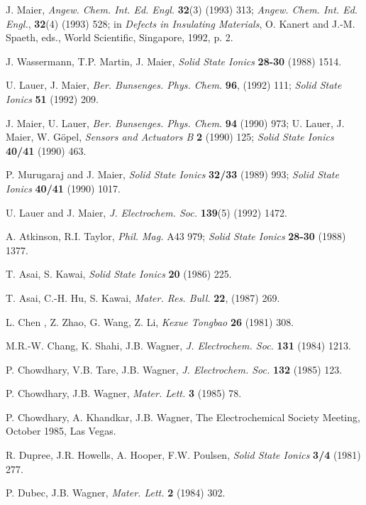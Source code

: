 \documentclass{elsart}
\begin{document}
\begin{thebibliography}{999}
 J. Maier, {\em Angew. Chem. Int. Ed. Engl.\/} {\bf 32}(3)
  (1993) 313; {\em Angew. Chem. Int. Ed. Engl.\/}, {\bf 32}(4) (1993) 528; in 
{\em Defects in Insulating Materials\/}, O. Kanert and J.-M. Spaeth, eds.,
World Scientific, Singapore, 1992, p. 2. 

 J. Wassermann, T.P. Martin, J. Maier, {\em Solid State Ionics\/}
{\bf 28-30} (1988) 1514.

 U. Lauer, J. Maier, {\em Ber. Bunsenges. Phys. Chem.\/} {\bf 96},
(1992) 111; {\em Solid State Ionics\/} {\bf 51} (1992) 209.

 J. Maier, U. Lauer, {\em Ber. Bunsenges. Phys. Chem.\/} {\bf
  94} (1990) 973; U. Lauer, J. Maier, W. G\"opel, {\em Sensors and Actuators
  B} {\bf 2} (1990) 125; {\em Solid State Ionics\/} {\bf 40/41} (1990) 463. 

 P. Murugaraj and J. Maier, {\em Solid State Ionics\/} {\bf
  32/33} (1989) 993; {\em Solid State Ionics\/} {\bf 40/41} (1990) 1017.

 U. Lauer and J. Maier, {\em J. Electrochem. Soc.\/} {\bf
  139}(5) (1992) 1472.  

 A. Atkinson, R.I. Taylor, {\em Phil. Mag.} A43 979; {\em Solid
    State Ionics\/} {\bf 28-30} (1988) 1377. 

 T. Asai, S. Kawai, {\em Solid State Ionics\/} {\bf 20} (1986) 225. 

 T. Asai, C.-H. Hu, S. Kawai, {\em Mater. Res. Bull.\/}  {\bf 22},
(1987) 269. 

 L. Chen , Z. Zhao, G. Wang, Z. Li, {\em Kexue Tongbao\/} {\bf
  26} (1981) 308.

 M.R.-W. Chang, K. Shahi, J.B. Wagner, {\em J. Electrochem.
Soc.\/} {\bf 131} (1984) 1213.

 P. Chowdhary, V.B. Tare, J.B. Wagner, {\em J. Electrochem.
Soc.\/} {\bf 132} (1985) 123.

 P. Chowdhary, J.B. Wagner, {\em Mater. Lett.\/} {\bf 3} (1985) 78. 

 P. Chowdhary, A. Khandkar, J.B. Wagner, The Electrochemical
Society Meeting, October 1985, Las Vegas.

 R. Dupree, J.R. Howells, A. Hooper, F.W. Poulsen, {\em Solid
State Ionics\/} {\bf 3/4} (1981) 277.

 P. Dubec, J.B. Wagner, {\em Mater. Lett.\/} {\bf 2} (1984) 302.


\end{thebibliography}
\end{document}

